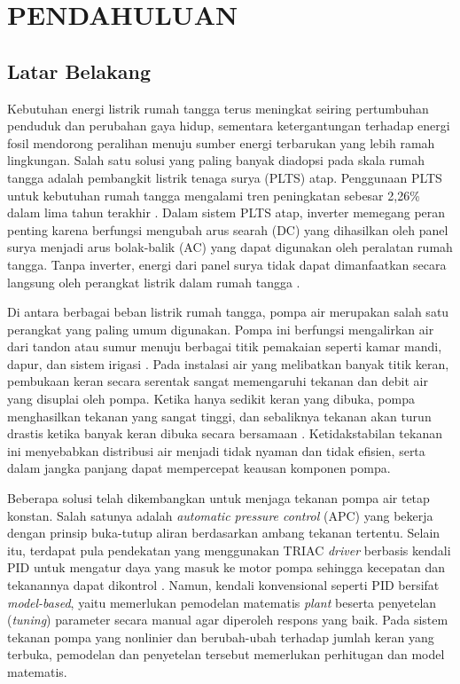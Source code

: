 ﻿\chapter{PENDAHULUAN}

\section{Latar Belakang}
Kebutuhan energi listrik rumah tangga terus meningkat seiring pertumbuhan
penduduk dan perubahan gaya hidup, sementara ketergantungan terhadap energi
fosil mendorong peralihan menuju sumber energi terbarukan yang lebih ramah
lingkungan. Salah satu solusi yang paling banyak diadopsi pada skala rumah
tangga adalah pembangkit listrik tenaga surya (PLTS) atap. Penggunaan PLTS
untuk kebutuhan rumah tangga mengalami tren peningkatan sebesar 2{,}26\% dalam
lima tahun terakhir \parencite{article}. Dalam sistem PLTS atap, inverter
memegang peran penting karena berfungsi mengubah arus searah (DC) yang
dihasilkan oleh panel surya menjadi arus bolak-balik (AC) yang dapat digunakan
oleh peralatan rumah tangga. Tanpa inverter, energi dari panel surya tidak
dapat dimanfaatkan secara langsung oleh perangkat listrik dalam rumah tangga
\parencite{10695139}.

Di antara berbagai beban listrik rumah tangga, pompa air merupakan salah satu
perangkat yang paling umum digunakan. Pompa ini berfungsi mengalirkan air dari
tandon atau sumur menuju berbagai titik pemakaian seperti kamar mandi, dapur,
dan sistem irigasi \parencite{SENTHILKUMAR2020303}. Pada instalasi air yang
melibatkan banyak titik keran, pembukaan keran secara serentak sangat
memengaruhi tekanan dan debit air yang disuplai oleh pompa. Ketika hanya sedikit
keran yang dibuka, pompa menghasilkan tekanan yang sangat tinggi, dan sebaliknya
tekanan akan turun drastis ketika banyak keran dibuka secara bersamaan
\parencite{anakub}. Ketidakstabilan tekanan ini menyebabkan distribusi air
menjadi tidak nyaman dan tidak efisien, serta dalam
jangka panjang dapat mempercepat keausan komponen pompa.

Beberapa solusi telah dikembangkan untuk menjaga tekanan pompa air tetap
konstan. Salah satunya adalah \emph{automatic pressure control} (APC) yang
bekerja dengan prinsip buka-tutup aliran berdasarkan ambang tekanan tertentu.
Selain itu, terdapat pula pendekatan yang menggunakan TRIAC \emph{driver}
berbasis kendali PID untuk mengatur daya yang masuk ke motor pompa sehingga
kecepatan dan tekanannya dapat dikontrol \parencite{anakits}.  
Namun, kendali konvensional seperti PID bersifat \emph{model-based}, yaitu
memerlukan pemodelan matematis \emph{plant} beserta penyetelan (\emph{tuning})
parameter secara manual agar diperoleh respons yang baik. Pada sistem tekanan
pompa yang nonlinier dan berubah-ubah terhadap jumlah keran yang terbuka,
pemodelan dan penyetelan tersebut memerlukan perhitugan dan model matematis.

